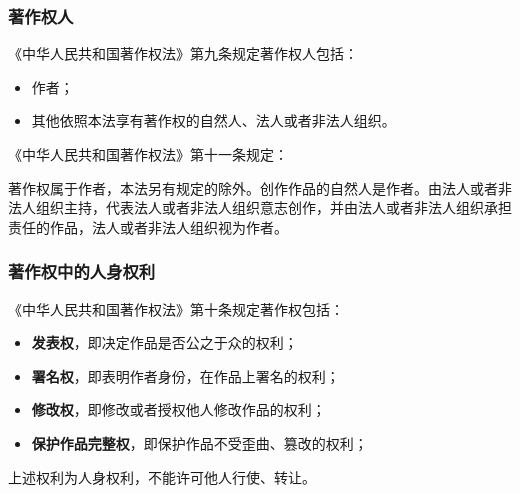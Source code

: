 \documentclass[xcolor=table,dvipsnames,svgnames,aspectratio=169]{ctexbeamer}
\begin{document}
\begin{frame}
  \frametitle{著作权人}
  《中华人民共和国著作权法》第九条规定著作权人包括：
  \begin{itemize}
    \item 作者；
    \item 其他依照本法享有著作权的自然人、法人或者非法人组织。
  \end{itemize}
  《中华人民共和国著作权法》第十一条规定：

  著作权属于作者，本法另有规定的除外。创作作品的自然人是作者。由法人或者非法人组织主持，代表法人或者非法人组织意志创作，并由法人或者非法人组织承担责任的作品，法人或者非法人组织视为作者。
\end{frame}

\begin{frame}
  \frametitle{著作权中的人身权利}
  《中华人民共和国著作权法》第十条规定著作权包括：
  \begin{itemize}
    \item \textbf{发表权}，即决定作品是否公之于众的权利；
    \item \textbf{署名权}，即表明作者身份，在作品上署名的权利；
    \item \textbf{修改权}，即修改或者授权他人修改作品的权利；
    \item \textbf{保护作品完整权}，即保护作品不受歪曲、篡改的权利；
  \end{itemize}

  上述权利为人身权利，不能许可他人行使、转让。
  
\end{frame}
\end{document}
